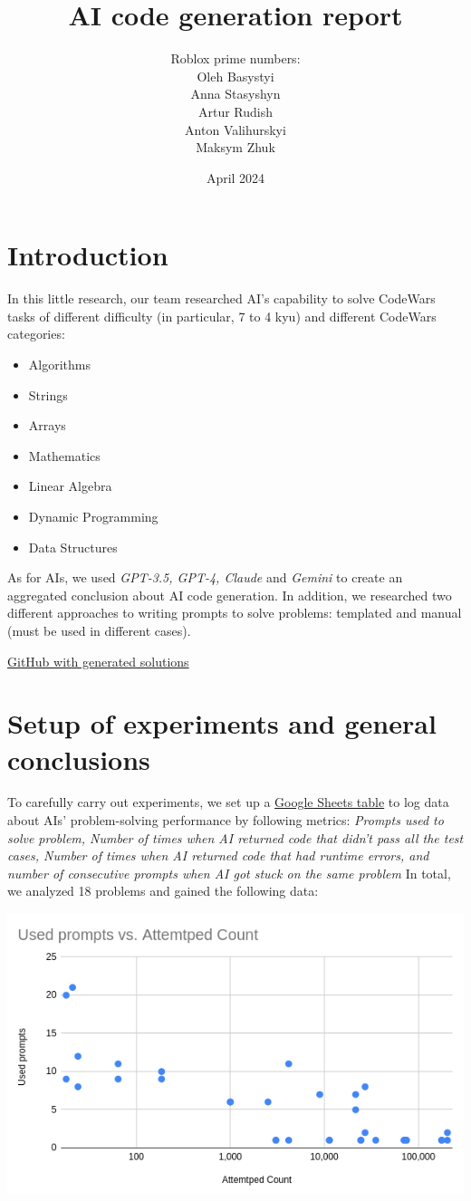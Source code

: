 \documentclass[12pt]{report}
\title{AI code generation report}
\author{Roblox prime numbers:\\\small{Oleh Basystyi}\\\small{Anna Stasyshyn}
\\\small{Artur Rudish}\\\small{Anton Valihurskyi}\\\small{Maksym Zhuk}}
\date{April 2024}
\begin{document}
	\maketitle
	\renewcommand{\thesection}{\arabic{section}}
	\section{Introduction}
	\qquad In this little research, our team researched AI's capability to solve CodeWars tasks of different difficulty (in particular, 7 to 4 kyu) and different CodeWars categories:
	\begin{itemize}
		\itemsep0em
		\item Algorithms
		\item Strings
		\item Arrays
		\item Mathematics
		\item Linear Algebra
		\item Dynamic Programming
		\item Data Structures
	\end{itemize}
	\qquad As for AIs, we used \textit{GPT-3.5, GPT-4, Claude} and \textit{Gemini} to create an aggregated conclusion about AI code generation. In addition, we researched two different approaches to writing prompts to solve problems: templated and manual (must be used in different cases).
	
	\href{https://github.com/n1n1n1q/Ai-benchmark/tree/main/Codewars-Solutions}{GitHub with generated solutions}

	\pagebreak
	\section{Setup of experiments and general conclusions}
	\qquad To carefully carry out experiments, we set up a \href{https://docs.google.com/spreadsheets/d/1qXPyAJsOOpmtxIoGqObwG5mTaLU3IWO0SQRGbjZPhEc/edit#gid=0}{Google Sheets table} to log data about AIs' problem-solving performance by following metrics: \textit{Prompts used to solve problem, Number of times when AI returned code that didn't pass all the test cases, Number of times when AI returned code that had runtime errors, and number of consecutive prompts when AI got stuck on the same problem} In total, we analyzed 18 problems and gained the following data:

	\includegraphics[width=\textwidth]{used_prompts_attempted_relation.png}
\end{document}
